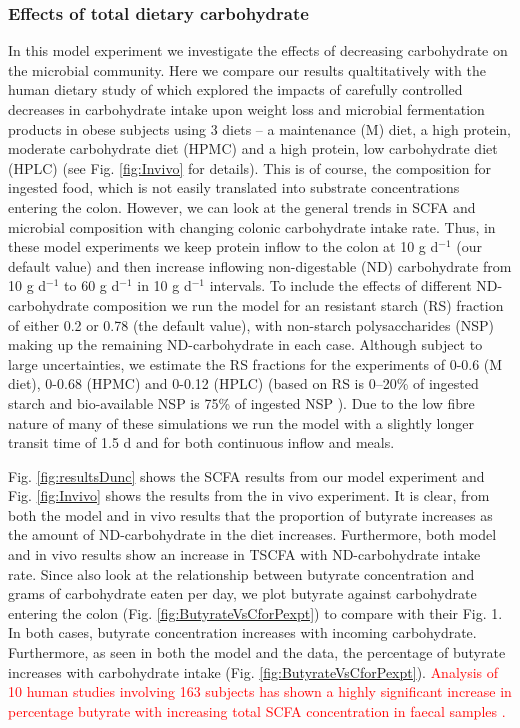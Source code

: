 \documentclass[a4paper]{article}
\begin{document}
\subsubsection*{Effects of total dietary carbohydrate}
\label{sect:protein}
In this model experiment we investigate the effects of decreasing carbohydrate on the microbial community. 
Here we compare our results qualtitatively with the human dietary study of \cite{duncan} which explored the impacts of carefully controlled decreases in carbohydrate intake upon weight loss and microbial fermentation products in obese subjects using 3 diets -- a maintenance (M) diet, a high protein, moderate carbohydrate diet (HPMC) and a high protein, low carbohydrate diet (HPLC) (see Fig. \ref{fig:Invivo} for details).
This is of course, the composition for ingested food, which is not easily translated into substrate concentrations entering the colon. 
However, we can look at the general trends in SCFA and microbial composition with changing colonic carbohydrate intake rate.
Thus, in these model experiments we keep protein inflow to the colon at 10 g d$^{-1}$ (our default value) and then increase inflowing non-digestable (ND) carbohydrate from 10 g d$^{-1}$ to 60 g d$^{-1}$ in 10 g d$^{-1}$ intervals. 
To include the effects of different ND-carbohydrate composition we run the model for an resistant starch (RS) fraction of either 0.2 or 0.78 (the default value), with non-starch polysaccharides (NSP) making up the remaining ND-carbohydrate in each case. 
Although subject to large uncertainties, we estimate the RS fractions for the \cite{duncan} experiments of 0-0.6 (M diet), 0-0.68 (HPMC) and 0-0.12 (HPLC) (based on RS is 0--20\% of ingested starch \citep{capuano} and bio-available NSP is 75\% of ingested NSP \citep{slavin}).
Due to the low fibre nature of many of these simulations we run the model with a slightly longer transit time of 1.5 d and for both continuous inflow and meals.


Fig. \ref{fig:resultsDunc} shows the SCFA results from our model experiment and Fig. \ref{fig:Invivo} shows the results from the in vivo experiment. 
It is clear, from both the model and in vivo results that the proportion of butyrate increases as the amount of ND-carbohydrate in the diet increases. Furthermore, both model and in vivo results show an increase in TSCFA with ND-carbohydrate intake rate. 
Since \cite{duncan} also look at the relationship between butyrate concentration and grams of carbohydrate eaten per day, we plot butyrate against carbohydrate entering the colon (Fig. \ref{fig:ButyrateVsCforPexpt}) to compare with their Fig. 1. 
In both cases, butyrate concentration increases with incoming carbohydrate.
Furthermore, as seen in both the model and the data, the percentage of butyrate increases with carbohydrate intake (Fig. \ref{fig:ButyrateVsCforPexpt}). 
\textcolor{red}{Analysis of 10 human studies involving 163 subjects has shown a highly significant increase in percentage butyrate with increasing total SCFA concentration in faecal samples \citep{labouyer}.}
\end{document}
